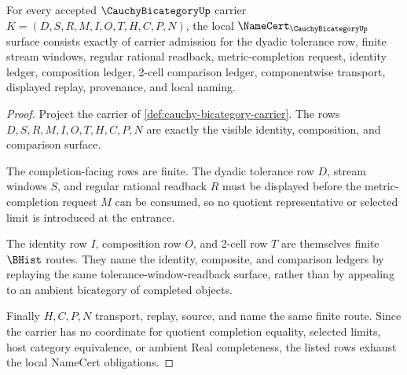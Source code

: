 \begin{theorem}
\label{thm:cauchy-bicategory-namecert-obligations}
For every accepted $\CauchyBicategoryUp$ carrier $K=(D,S,R,M,I,O,T,H,C,P,N)$, the local $\NameCert_{\CauchyBicategoryUp}$ surface consists exactly of carrier admission for the dyadic tolerance row, finite stream windows, regular rational readback, metric-completion request, identity ledger, composition ledger, 2-cell comparison ledger, componentwise transport, displayed replay, provenance, and local naming.
\end{theorem}
\begin{proof}
Project the carrier of \autoref{def:cauchy-bicategory-carrier}. The rows $D,S,R,M,I,O,T,H,C,P,N$ are exactly the visible identity, composition, and comparison surface.

The completion-facing rows are finite. The dyadic tolerance row $D$, stream windows $S$, and regular rational readback $R$ must be displayed before the metric-completion request $M$ can be consumed, so no quotient representative or selected limit is introduced at the entrance.

The identity row $I$, composition row $O$, and 2-cell row $T$ are themselves finite $\BHist$ routes. They name the identity, composite, and comparison ledgers by replaying the same tolerance-window-readback surface, rather than by appealing to an ambient bicategory of completed objects.

Finally $H,C,P,N$ transport, replay, source, and name the same finite route. Since the carrier has no coordinate for quotient completion equality, selected limits, host category equivalence, or ambient Real completeness, the listed rows exhaust the local NameCert obligations.
\end{proof}

